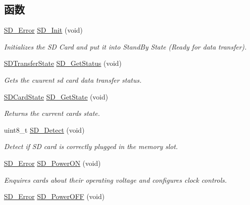 \subsection*{函数}
\begin{DoxyCompactItemize}
\item 
\hyperlink{group__sd__card_gacff91fa68daa1d1ee967b5b3fb3dbd8c}{S\+D\+\_\+\+Error} \hyperlink{group__sd__card__private_ga3c927d4d98ffb6f3cc2442b09c19926c}{S\+D\+\_\+\+Init} (void)
\begin{DoxyCompactList}\small\item\em Initializes the SD Card and put it into Stand\+By State (Ready for data transfer). \end{DoxyCompactList}\item 
\hyperlink{group__sd__card_gace0484a459648257c3eae8ea60f64fbf}{S\+D\+Transfer\+State} \hyperlink{group__sd__card__private_gaf3f228aaee7b2b18acc056b2f27ca3f7}{S\+D\+\_\+\+Get\+Status} (void)
\begin{DoxyCompactList}\small\item\em Gets the cuurent sd card data transfer status. \end{DoxyCompactList}\item 
\hyperlink{group__sd__card_gacdc2533a9bff7dc10def0945f5915398}{S\+D\+Card\+State} \hyperlink{group__sd__card__private_ga1c49d266e4f9ba33b7a425361a30d227}{S\+D\+\_\+\+Get\+State} (void)
\begin{DoxyCompactList}\small\item\em Returns the current card\textquotesingle{}s state. \end{DoxyCompactList}\item 
uint8\+\_\+t \hyperlink{group__sd__card__private_gacb7415873dffa26068c5e46025efebfa}{S\+D\+\_\+\+Detect} (void)
\begin{DoxyCompactList}\small\item\em Detect if SD card is correctly plugged in the memory slot. \end{DoxyCompactList}\item 
\hyperlink{group__sd__card_gacff91fa68daa1d1ee967b5b3fb3dbd8c}{S\+D\+\_\+\+Error} \hyperlink{group__sd__card__private_ga9fbd4dd6187701cbe286ddb163e9c312}{S\+D\+\_\+\+Power\+ON} (void)
\begin{DoxyCompactList}\small\item\em Enquires cards about their operating voltage and configures clock controls. \end{DoxyCompactList}\item 
\hyperlink{group__sd__card_gacff91fa68daa1d1ee967b5b3fb3dbd8c}{S\+D\+\_\+\+Error} \hyperlink{group__sd__card__private_ga9f053c27018521095d7333e7df238764}{S\+D\+\_\+\+Power\+O\+FF} (void)

\end{DoxyCompactItemize}

